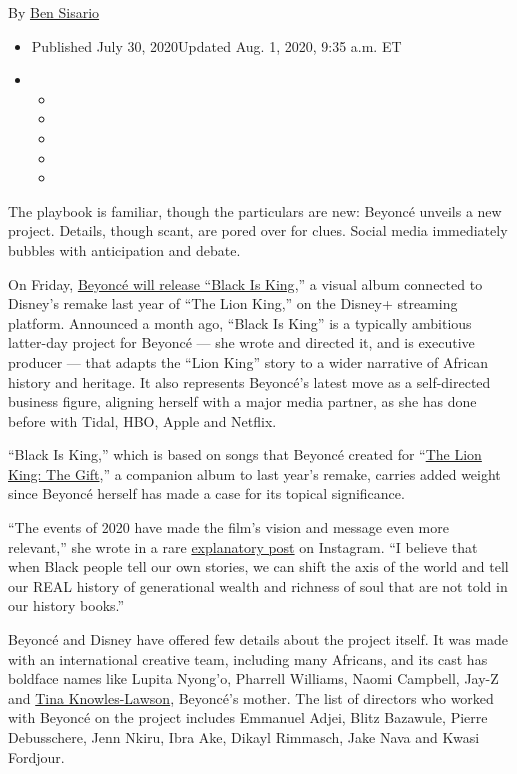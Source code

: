 By \href{https://www.nytimes3xbfgragh.onion/by/ben-sisario}{Ben Sisario}

\begin{itemize}
\item
  Published July 30, 2020Updated Aug. 1, 2020, 9:35 a.m. ET
\item
  \begin{itemize}
  \item
  \item
  \item
  \item
  \item
  \end{itemize}
\end{itemize}

The playbook is familiar, though the particulars are new: Beyoncé
unveils a new project. Details, though scant, are pored over for clues.
Social media immediately bubbles with anticipation and debate.

On Friday,
\href{https://www.nytimes3xbfgragh.onion/2020/07/31/arts/music/beyonce-black-is-king.html}{Beyoncé
will release ``Black Is King},'' a visual album connected to Disney's
remake last year of ``The Lion King,'' on the Disney+ streaming
platform. Announced a month ago, ``Black Is King'' is a typically
ambitious latter-day project for Beyoncé --- she wrote and directed it,
and is executive producer --- that adapts the ``Lion King'' story to a
wider narrative of African history and heritage. It also represents
Beyoncé's latest move as a self-directed business figure, aligning
herself with a major media partner, as she has done before with Tidal,
HBO, Apple and Netflix.

``Black Is King,'' which is based on songs that Beyoncé created for
``\href{https://www.nytimes3xbfgragh.onion/2019/07/24/arts/music/beyonce-the-lion-king-the-gift-review.html}{The
Lion King: The Gift},'' a companion album to last year's remake, carries
added weight since Beyoncé herself has made a case for its topical
significance.

``The events of 2020 have made the film's vision and message even more
relevant,'' she wrote in a rare
\href{https://www.instagram.com/tv/CCAMxfrHjAL/}{explanatory post} on
Instagram. ``I believe that when Black people tell our own stories, we
can shift the axis of the world and tell our REAL history of
generational wealth and richness of soul that are not told in our
history books.''

Beyoncé and Disney have offered few details about the project itself. It
was made with an international creative team, including many Africans,
and its cast has boldface names like Lupita Nyong'o, Pharrell Williams,
Naomi Campbell, Jay-Z and
\href{https://www.nytimes3xbfgragh.onion/2017/01/21/fashion/tina-knowles-lawson-beyonce-solange-matriarch.html}{Tina
Knowles-Lawson}, Beyoncé's mother. The list of directors who worked with
Beyoncé on the project includes Emmanuel Adjei, Blitz Bazawule, Pierre
Debusschere, Jenn Nkiru, Ibra Ake, Dikayl Rimmasch, Jake Nava and Kwasi
Fordjour.

